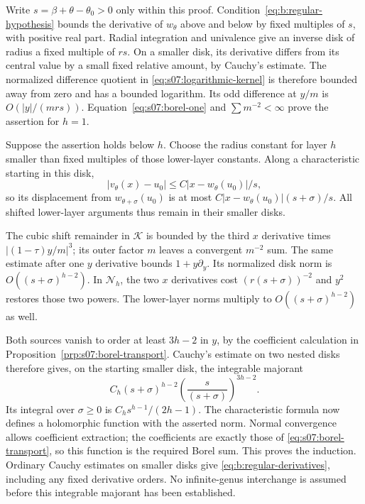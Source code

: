 \begin{prf}
Write $s=\beta+\theta-\theta_0>0$ only within this proof.
Condition~\eqref{eq:b:regular-hypothesis} bounds the derivative of
$w_\theta$ above and below by fixed multiples of $s$, with
positive real part. Radial integration and univalence give an inverse
disk of radius a fixed multiple of $r s$. On a smaller
disk, its derivative differs from its central value by a small fixed
relative amount, by Cauchy's estimate. The normalized difference
quotient in \eqref{eq:s07:logarithmic-kernel} is therefore bounded
away from zero and has a bounded logarithm. Its odd difference at
$y/m$ is $O(|y|/(m r s))$. Equation~\eqref{eq:s07:borel-one}
and $\sum m^{-2}<\infty$ prove the assertion for $h=1$.

Suppose the assertion holds below $h$. Choose the radius constant
for layer $h$ smaller than fixed multiples of those lower-layer
constants. Along a characteristic starting in this disk,
\[
 |v_\theta(x)-u_0|
       \leq C|x-w_\theta(u_0)|/s,
\]
so its displacement from $w_{\theta+\sigma}(u_0)$ is at most
$C|x-w_\theta(u_0)|(s+\sigma)/s$.
All shifted lower-layer arguments thus remain in their smaller disks.

The cubic shift remainder in $\mathcal K$ is bounded by the third
$x$ derivative times $|(1-\tau)y/m|^3$; its outer factor $m$
leaves a convergent $m^{-2}$ sum. The same estimate after one
$y$ derivative bounds $1+y\partial_y$. Its normalized disk norm
is $O((s+\sigma)^{h-2})$. In $\mathcal N_h$, the two
$x$ derivatives cost $(r (s+\sigma))^{-2}$ and $y^2$
restores those two powers. The lower-layer norms multiply to
$O((s+\sigma)^{h-2})$ as well.

Both sources vanish to order at least $3h-2$ in $y$, by the
coefficient calculation in Proposition~\ref{prp:s07:borel-transport}.
Cauchy's estimate on two nested disks therefore gives, on the
starting smaller disk, the integrable majorant
\begin{equation}\label{eq:b:regular-integral}
 C_h (s+\sigma)^{h-2}
         \left(\frac{s}{(s+\sigma)}\right)^{3h-2}.
\end{equation}
Its integral over $\sigma\geq0$ is
$C_h s^{h-1}/(2h-1)$. The characteristic formula now
defines a holomorphic function with the asserted norm. Normal
convergence allows coefficient extraction; the coefficients are
exactly those of \eqref{eq:s07:borel-transport}, so this function
is the required Borel sum. This proves the induction.
Ordinary Cauchy estimates on smaller disks give
\eqref{eq:b:regular-derivatives}, including any fixed derivative
orders. No infinite-genus interchange is assumed before this
integrable majorant has been established.
\end{prf}

